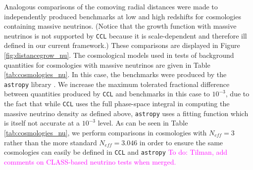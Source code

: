 \documentclass[\docopts]{\docclass}
\newcommand{\todo}[1]{\textcolor{magenta}{To do: #1}}
\newcommand{\ccl}{{\tt CCL}\xspace}
\begin{document}
Analogous comparisons of the comoving radial distances were made to independently produced benchmarks at low and high redshifts for cosmologies containing massive neutrinos. (Notice that the growth function with massive neutrinos is not supported by \ccl because it is scale-dependent and therefore ill defined in our current framework.) These comparisons are displayed in Figure \ref{fig:distancegrow_nu}. The cosmological models used in tests of background quantities for cosmologies with massive neutrinos are given in Table \ref{tab:cosmologies_nu}. In this case, the benchmarks were produced by the {\tt astropy} library \citep{astropy}. We increase the maximum tolerated fractional difference between quantities produced by \ccl and benchmarks in this case to $10^{-3}$, due to the fact that while \ccl uses the full phase-space integral in computing the massive neutrino density as defined above, {\tt astropy} uses a fitting function which is itself not accurate at a $10^{-3}$ level. As can be seen in Table \ref{tab:cosmologies_nu}, we perform comparisons in cosmologies with $N_{eff}=3$ rather than the more standard $N_{eff}=3.046$ in order to ensure the same cosmologies can easily be defined in \ccl and {\tt astropy} \todo{Tilman, add comments on CLASS-based neutrino tests when merged.}


\end{document}
